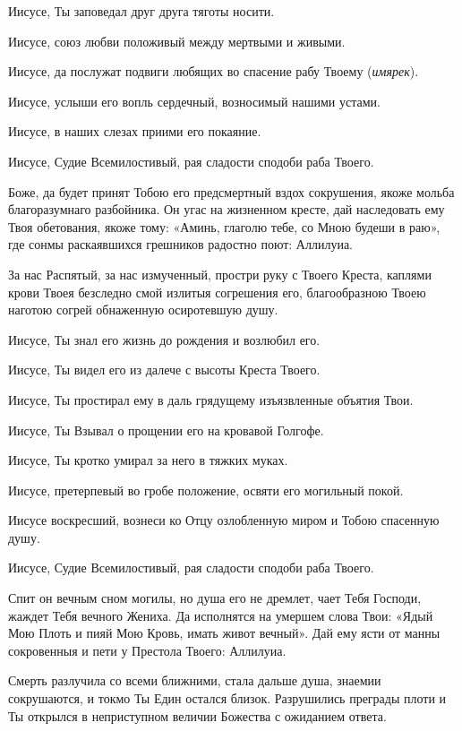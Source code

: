 \begin{mymulticols}
Иисусе, Ты заповедал друг друга тяготы носити. 

Иисусе, союз любви положивый между мертвыми и живыми. 

Иисусе, да послужат подвиги любящих во спасение рабу Твоему ({\itshape имярек}). 

Иисусе, услыши его вопль сердечный, возносимый нашими устами. 

Иисусе, в наших слезах приими его покаяние. 

Иисусе, Судие Всемилостивый, рая сладости сподоби раба Твоего.




Боже, да будет принят Тобою его предсмертный вздох сокрушения, якоже мольба благоразумнаго разбойника. Он угас на жизненном кресте, дай наследовать ему Твоя обетования, якоже тому: «Аминь, глаголю тебе, со Мною будеши в раю», где сонмы раскаявшихся грешников радостно поют: Аллилуиа.




За нас Распятый, за нас измученный, простри руку с Твоего Креста, каплями крови Твоея безследно смой излитыя согрешения его, благообразною Твоею наготою согрей обнаженную осиротевшую душу. 

Иисусе, Ты знал его жизнь до рождения и возлюбил его. 

Иисусе, Ты видел его из далече с высоты Креста Твоего. 

Иисусе, Ты простирал ему в даль грядущему изъязвленные объятия Твои. 

Иисусе, Ты Взывал о прощении его на кровавой Голгофе. 

Иисусе, Ты кротко умирал за него в тяжких муках. 

Иисусе, претерпевый во гробе положение, освяти его могильный покой. 

Иисусе воскресший, вознеси ко Отцу озлобленную миром и Тобою спасенную душу. 

Иисусе, Судие Всемилостивый, рая сладости сподоби раба Твоего.




Спит он вечным сном могилы, но душа его не дремлет, чает Тебя Господи, жаждет Тебя вечного Жениха. Да исполнятся на умершем слова Твои: «Ядый Мою Плоть и пияй Мою Кровь, имать живот вечный». Дай ему ясти от манны сокровенныя и пети у Престола Твоего: Аллилуиа.




Смерть разлучила со всеми ближними, стала дальше душа, знаемии сокрушаются, и токмо Ты Един остался близок. Разрушились преграды плоти и Ты открылся в неприступном величии Божества с ожиданием ответа. 


\end{mymulticols}
